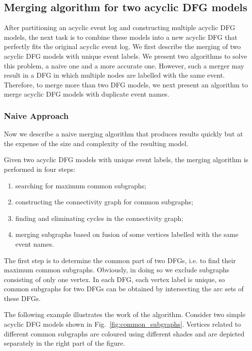 \documentclass[11pt]{article}
\theoremstyle{definition}
\begin{document}
\subsection{Merging algorithm for two acyclic DFG models}\label{sec:algo}

After partitioning an acyclic event log and constructing multiple acyclic DFG models, the next task is to combine these models into a new acyclic DFG that perfectly fits the original acyclic event log.  We first describe the merging of two acyclic DFG models with unique event labels. We present two algorithms to solve this problem, a naive one and a more accurate one. However, such a merger may result in a DFG in which multiple nodes are labelled with the same event. Therefore, to merge more than two DFG models, we next present an algorithm to merge acyclic DFG models with duplicate event names.

\subsubsection{Naive Approach}\label{sec:naive}

Now we describe a naive merging algorithm that produces results quickly but at the expense of the size and complexity of the resulting model.

Given two acyclic DFG models with unique event labels, the merging algorithm is performed in four steps:

\begin{enumerate}
    \item searching for maximum common subgraphs;
    \item constructing the connectivity graph for common subgraphs;
    \item finding and eliminating cycles in the connectivity graph;
    \item merging subgraphs based on  fusion of some vertices labelled with the same event names.
\end{enumerate}

The first step is to determine the common part of two DFGs, i.e. to find their maximum common subgraphs. Obviously, in doing so we exclude subgraphs consisting of only one vertex.
In each DFG, each vertex label is unique, so common subgraphs for two DFGs can be obtained by intersecting the arc sets of these DFGs.

The following example illustrates the work of the algorithm.
Consider two simple acyclic DFG models shown in Fig.~\ref{fig:common_subgraphs}. 
Vertices related to different common subgraphs are coloured using different shades and are depicted separately in the right part of the figure.
\end{document}
